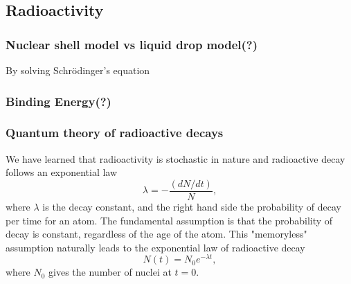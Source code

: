 \documentclass[preprint,aip,pra]{revtex4-1}
\begin{document}
    \subsection{Radioactivity}
    \subsubsection{Nuclear shell model vs liquid drop model(?)}
        By solving Schr\"{o}dinger's equation\cite{k88}
    \subsubsection{Binding Energy(?)}

        \subsubsection{Quantum theory of radioactive decays}
        We have learned that radioactivity is stochastic in nature and radioactive decay follows
        an exponential law
        \begin{equation} \label{eq:exp}
            \lambda = -\frac{(dN/dt)}{N},
        \end{equation}
        where $\lambda$ is the decay constant, and the right hand side the probability of decay
        per time for an atom. The fundamental assumption is that the probability of decay is constant,
        regardless of the age of the atom. This "memoryless" assumption naturally leads to the
        exponential law of radioactive decay
        \begin{equation}
            N(t) = N_0 e^{-\lambda t},
        \end{equation}
        where $N_0$ gives the number of nuclei at $t=0$.
\end{document}
